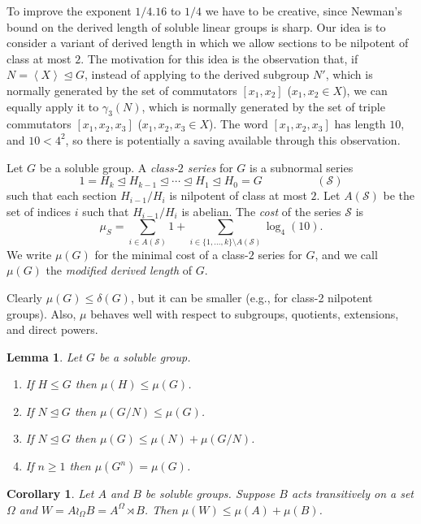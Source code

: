 \documentclass[11pt,reqno]{amsart}
\numberwithin{equation}{section}
\newtheorem{lemma}[theorem]{Lemma}
\newtheorem{corollary}[theorem]{Corollary}
\theoremstyle{definition}
\theoremstyle{remark}
\def\nsgp{\trianglelefteq}
\newcommand\gen[1]{\left\langle#1\right\rangle}
\numberwithin{equation}{section}
\begin{document}
To improve the exponent $1/4.16$ to $1/4$ we have to be creative, since Newman's bound on the derived length of soluble linear groups is sharp.
Our idea is to consider a variant of derived length in which we allow sections to be nilpotent of class at most $2$.
The motivation for this idea is the observation that, if $N = \gen X \nsgp G$, instead of applying  to the derived subgroup $N'$, which is normally generated by the set of commutators $[x_1, x_2]$ ($x_1, x_2 \in X$),
we can equally apply it to $\gamma_3(N)$, which is normally generated by the set of triple commutators $[x_1, x_2, x_3]$ ($x_1, x_2, x_3 \in X$).
The word $[x_1, x_2, x_3]$ has length $10$, and $10 < 4^2$, so there is potentially a saving available through this observation.

Let $G$ be a soluble group.
A \emph{class-$2$ series} for $G$ is a subnormal series
\[
    1 = H_k \nsgp H_{k-1} \nsgp \cdots \nsgp H_1 \nsgp H_0 = G \hspace{2cm} (\mathcal S)
\]
such that each section $H_{i-1} / H_i$ is nilpotent of class at most $2$.
Let $A(\mathcal S)$ be the set of indices $i$ such that $H_{i-1} / H_i$ is abelian.
The \emph{cost} of the series $\mathcal S$ is
\[
    \mu_S= \sum_{i\in A(\mathcal{S})} 1 + \sum_{i\in\{1,\dots,k\}\setminus A(\mathcal{S})} \log_4(10).
\]
We write $\mu(G)$ for the minimal cost of a class-$2$ series for $G$, and we call $\mu(G)$ the \emph{modified derived length} of $G$.

Clearly $\mu(G) \le \delta(G)$, but it can be smaller (e.g., for class-2 nilpotent groups).
Also, $\mu$ behaves well with respect to subgroups, quotients, extensions, and direct powers.

\begin{lemma}
    Let $G$ be a soluble group.
    \begin{enumerate}
        \item If $H \le G$ then $\mu(H) \le \mu(G)$.
        \item If $N \nsgp G$ then $\mu(G/N) \le \mu(G)$.
        \item If $N \nsgp G$ then $\mu(G) \le \mu(N) + \mu(G/N)$.
        \item If $n \ge 1$ then $\mu(G^n) = \mu(G)$.
    \end{enumerate}
\end{lemma}

\begin{corollary}
    Let $A$ and $B$ be soluble groups. Suppose $B$ acts transitively on a set $\Omega$ and $W = A \wr_\Omega B = A^\Omega \rtimes B$. Then $\mu(W) \le \mu(A) + \mu(B)$.
\end{corollary}
\end{document}
